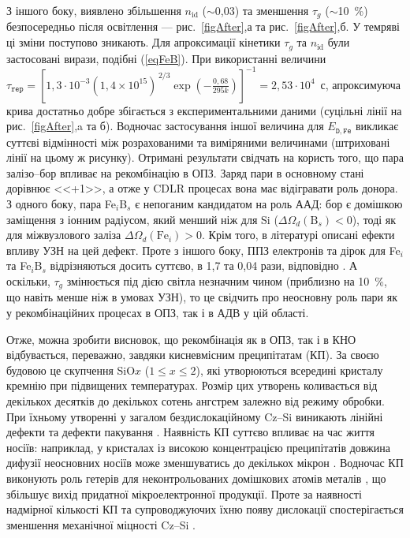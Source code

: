 З іншого боку, виявлено збільшення $n_{\mathrm{id}}$ ($\sim$0,03) та зменшення $\tau_g$ ($\sim$10~\%) безпосередньо після освітлення
--- рис.~\ref{figAfter},а та рис.~\ref{figAfter},б.
У темряві ці зміни поступово зникають.
Для апроксимації кінетики $\tau_g$ та $n_{\mathrm{id}}$ були застосовані вирази, подібні (\ref{eqFeB}).
При використанні величини $\tau_{\mathtt{rep}}=\left[1,3\cdot10^{-3}(1,4\times10^{15})^{\,2/3}\exp\left(-\frac{0,68}{295k}\right)\right]^{-1}=2,53\cdot10^4$~с,
апроксимуюча крива достатньо добре збігається з експериментальними даними
(суцільні лінії на рис.~\ref{figAfter},a та б).
Водночас застосування іншої величина для $E_{\mathtt{D,Fe}}$ викликає суттєві відмінності між розрахованими та виміряними величинами
(штриховані лінії на цьому ж рисунку).
Отримані результати свідчать на користь того, що пара залізо--бор впливає
на рекомбінацію в ОПЗ.
Заряд пари в основному стані дорівнює <<+1>>, а отже у CDLR процесах вона має відігравати роль донора.
З одного боку, пара Fe$_i$B$_s$ є непоганим кандидатом на роль ААД:
бор є домішкою заміщення з іонним радіусом, який менший ніж для Si ($\Delta\Omega_d (\mbox{B}_s)<0$),
тоді як для міжвузлового заліза $\Delta\Omega_d (\mbox{Fe}_i)>0$.
Крім того,  в літературі \cite{Ostapenko1995,OlikhFTT} описані ефекти впливу УЗН на цей дефект.
Проте з іншого боку, ППЗ електронів та дірок для Fe$_i$ та Fe$_i$B$_s$ відрізняються досить суттєво, в 1,7 та 0,04 рази, відповідно \cite{MurphyJAP2011}.
А оскільки, $\tau_g$ змінюється під дією світла незначним чином (приблизно на 10~\%, що навіть менше ніж в умовах УЗН), то це свідчить про
неосновну роль пари як у рекомбінаційних процесах в ОПЗ, так і в АДВ у цій області.


Отже, можна зробити висновок, що рекомбінація як в ОПЗ, так і в КНО відбувається, переважно,
завдяки кисневмісним преципітатам (КП).
За своєю будовою  це скупчення SiO$x$ ($1\leq x\leq2$), які утворюються всередині кристалу кремнію при підвищених температурах.
Розмір цих утворень коливається від декількох десятків до декількох сотень ангстрем залежно від режиму обробки.
При їхньому утворенні у загалом бездислокаційному Cz--Si виникають лінійні дефекти та дефекти пакування \cite{SiO:Hwang,SiO:Vanhell}.
Наявність КП суттєво впливає на час життя носіїв:
наприклад, у кристалах із високою концентрацією преципітатів довжина дифузії неосновних носіїв може зменшуватись до декількох мікрон \cite{SiO:Hwang}.
Водночас КП виконують роль гетерів для неконтрольованих домішкових атомів металів \cite{APR:Oxigen,MSER74},
що збільшує вихід придатної мікроелектронної продукції.
Проте за наявності надмірної кількості КП та супроводжуючих їхню появу дислокації
спостерігається зменшення механічної міцності Cz--Si \cite{MSER74}.


